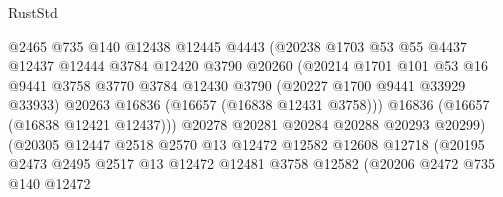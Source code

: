 \begin{lexlean}{RustStd}
\begin{coremodule}
                                @2465
                                @735
                                @140
                                @12438
                                @12445
                                @4443
                                (@20238
                                  @1703
                                  @53
                                  @55
                                  @4437
                                  @12437
                                  @12444
                                  @3784
                                  @12420
                                  @3790
                                  @20260
                                  (@20214
                                    @1701
                                    @101
                                    @53
                                    @16
                                    @9441
                                    @3758
                                    @3770
                                    @3784
                                    @12430
                                    @3790
                                    (@20227 @1700 @9441 @33929 @33933)
                                    @20263
                                    @16836
                                    (@16657 (@16838 @12431 @3758)))
                                  @16836
                                  (@16657 (@16838 @12421 @12437)))
                                @20278
                                @20281
                                @20284
                                @20288
                                @20293
                                @20299)
                              (@20305
                                @12447
                                @2518
                                @2570
                                @13
                                @12472
                                @12582
                                @12608
                                @12718
                                (@20195
                                  @2473
                                  @2495
                                  @2517
                                  @13
                                  @12472
                                  @12481
                                  @3758
                                  @12582
                                  (@20206
                                    @2472
                                    @735
                                    @140
                                    @12472

\end{coremodule}
\end{lexlean}
